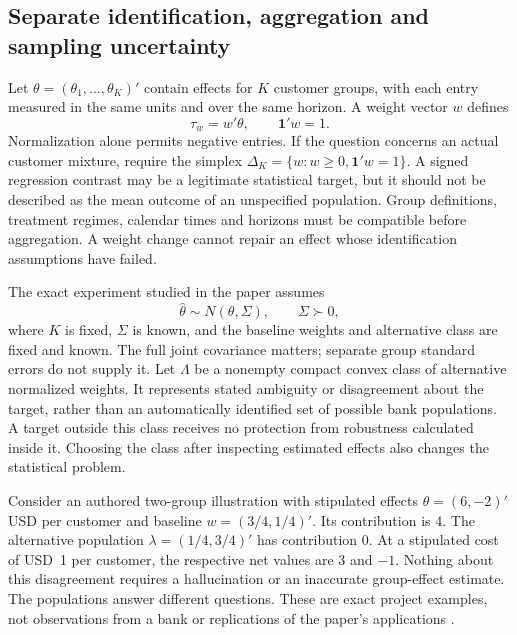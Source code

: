 \subsection{Separate identification, aggregation and sampling uncertainty}

Let $\theta=(\theta_1,\ldots,\theta_K)'$ contain effects for $K$ customer groups,
with each entry measured in the same units and over the same horizon. A weight
vector $w$ defines
\begin{equation}
 \tau_w=w'\theta,\qquad \mathbf{1}'w=1.
 \label{exec22:targets-definition}
\end{equation}
Normalization alone permits negative entries. If the question concerns an
actual customer mixture, require the simplex
$\Delta_K=\{w:w\geq0,\mathbf{1}'w=1\}$. A signed regression contrast may be a
legitimate statistical target, but it should not be described as the mean
outcome of an unspecified population. Group definitions, treatment regimes,
calendar times and horizons must be compatible before aggregation. A weight
change cannot repair an effect whose identification assumptions have failed.

The exact experiment studied in the paper assumes
\begin{equation}
 \widehat\theta\sim N(\theta,\Sigma),\qquad \Sigma\succ0,
 \label{exec22:targets-experiment}
\end{equation}
where $K$ is fixed, $\Sigma$ is known, and the baseline weights and alternative
class are fixed and known. The full joint covariance matters; separate group
standard errors do not supply it. Let $\Lambda$ be a nonempty compact convex
class of alternative normalized weights. It represents stated ambiguity or
disagreement about the target, rather than an automatically identified set of
possible bank populations. A target outside this class receives no protection
from robustness calculated inside it. Choosing the class after inspecting
estimated effects also changes the statistical problem.

Consider an authored two-group illustration with stipulated effects
$\theta=(6,-2)'$ USD per customer and baseline
$w=(3/4,1/4)'$. Its contribution is $4$. The alternative population
$\lambda=(1/4,3/4)'$ has contribution $0$. At a stipulated cost of USD~1 per
customer, the respective net values are $3$ and $-1$. Nothing about this
disagreement requires a hallucination or an inaccurate group-effect estimate.
The populations answer different questions. These are exact project examples,
not observations from a bank or replications of the paper's applications
\cite{exec22_weighted_reference}.

